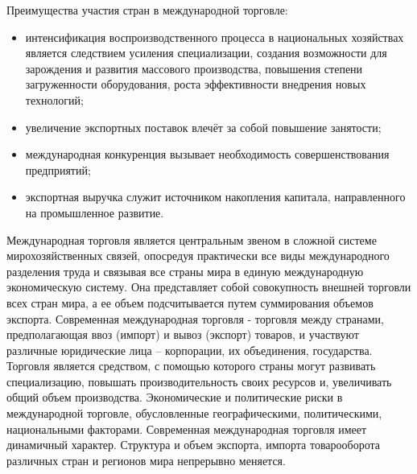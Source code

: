 Преимущества участия стран в международной торговле:
\begin{itemize}
    \item интенсификация воспроизводственного процесса в национальных
  хозяйствах является следствием усиления специализации, создания возможности
  для зарождения и развития массового производства, повышения степени
  загруженности оборудования, роста эффективности внедрения новых технологий;
    \item увеличение экспортных поставок влечёт за собой повышение занятости;
    \item международная конкуренция вызывает необходимость совершенствования
  предприятий;
    \item экспортная выручка служит источником накопления капитала,
  направленного на промышленное развитие.
\end{itemize}

Международная торговля является центральным звеном в сложной системе
мирохозяйственных связей, опосредуя практически все виды международного
разделения труда и связывая все страны мира в единую международную
экономическую систему. Она представляет собой совокупность внешней торговли
всех стран мира, а ее объем подсчитывается путем суммирования объемов экспорта.
Современная международная торговля - торговля между странами, предполагающая
ввоз (импорт) и вывоз (экспорт) товаров, и участвуют различные юридические лица
-- корпорации, их объединения, государства. Торговля является средством, с
помощью которого страны могут развивать специализацию, повышать
производительность своих ресурсов и, увеличивать общий объем производства.
Экономические и политические риски в международной торговле, обусловленные
географическими, политическими, национальными факторами. Современная
международная торговля имеет динамичный характер. Структура и объем экспорта,
импорта товарооборота различных стран и регионов мира непрерывно меняется.

